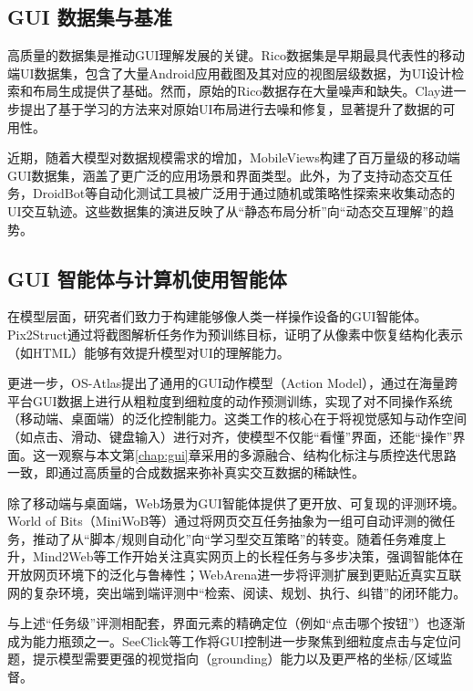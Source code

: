 \subsection{GUI 数据集与基准}
高质量的数据集是推动GUI理解发展的关键。Rico数据集是早期最具代表性的移动端UI数据集，包含了大量Android应用截图及其对应的视图层级数据，为UI设计检索和布局生成提供了基础\citep{deka2017rico}。然而，原始的Rico数据存在大量噪声和缺失。Clay进一步提出了基于学习的方法来对原始UI布局进行去噪和修复，显著提升了数据的可用性\citep{li2022clay}。

近期，随着大模型对数据规模需求的增加，MobileViews构建了百万量级的移动端GUI数据集，涵盖了更广泛的应用场景和界面类型\citep{gao2024mobileviews}。此外，为了支持动态交互任务，DroidBot等自动化测试工具被广泛用于通过随机或策略性探索来收集动态的UI交互轨迹\citep{droidbot}。这些数据集的演进反映了从“静态布局分析”向“动态交互理解”的趋势。

\subsection{GUI 智能体与计算机使用智能体}
在模型层面，研究者们致力于构建能够像人类一样操作设备的GUI智能体。Pix2Struct通过将截图解析任务作为预训练目标，证明了从像素中恢复结构化表示（如HTML）能够有效提升模型对UI的理解能力\citep{lee2023pix2struct}。

更进一步，OS-Atlas提出了通用的GUI动作模型（Action Model），通过在海量跨平台GUI数据上进行从粗粒度到细粒度的动作预测训练，实现了对不同操作系统（移动端、桌面端）的泛化控制能力\citep{wu2024osatlas}。这类工作的核心在于将视觉感知与动作空间（如点击、滑动、键盘输入）进行对齐，使模型不仅能“看懂”界面，还能“操作”界面。这一观察与本文第\ref{chap:gui}章采用的多源融合、结构化标注与质控迭代思路一致，即通过高质量的合成数据来弥补真实交互数据的稀缺性。

除了移动端与桌面端，Web场景为GUI智能体提供了更开放、可复现的评测环境。World of Bits（MiniWoB等）通过将网页交互任务抽象为一组可自动评测的微任务，推动了从“脚本/规则自动化”向“学习型交互策略”的转变\citep{shi2017worldofbits}。随着任务难度上升，Mind2Web等工作开始关注真实网页上的长程任务与多步决策，强调智能体在开放网页环境下的泛化与鲁棒性\citep{deng2023mind2web}；WebArena进一步将评测扩展到更贴近真实互联网的复杂环境，突出端到端评测中“检索、阅读、规划、执行、纠错”的闭环能力\citep{zhou2023webarena}。

与上述“任务级”评测相配套，界面元素的精确定位（例如“点击哪个按钮”）也逐渐成为能力瓶颈之一。SeeClick等工作将GUI控制进一步聚焦到细粒度点击与定位问题，提示模型需要更强的视觉指向（grounding）能力以及更严格的坐标/区域监督\citep{liu2024seeclick}。

